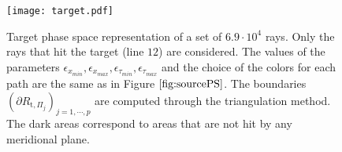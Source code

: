  \begin{figure}[h]
  \begin{center}
  \texttt{[image: target.pdf]}
  \end{center}
  \caption{\footnotesize{Target phase space representation of a set of $6.9 \cdot 10^4$ rays. Only the rays that hit the target (line $12$) are considered.
  The values of the parameters $\epsilon_{x_{min}}, \epsilon_{x_{max}}, \epsilon_{\tau_{min}}, \epsilon_{\tau_{max}}$ and the choice of the colors for each path are the same as in Figure $\ref{fig:sourcePS}$.
 The boundaries $(\partial R_{\textrm{t}, \Pi_j})_{j = 1, \cdots, p}$ are computed through the triangulation method. The dark areas correspond to areas that are not hit by any meridional plane.}}
  \label{fig:targetPS}
\end{figure}

